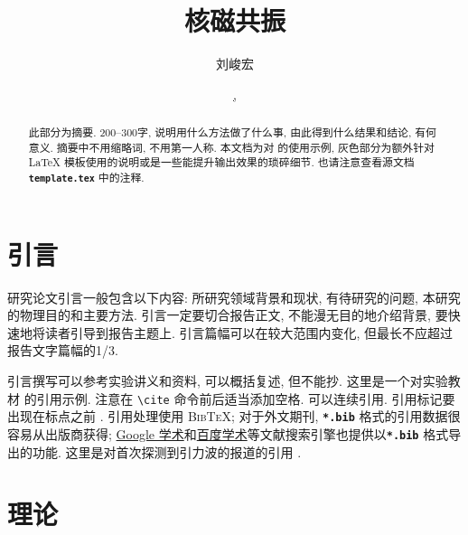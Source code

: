 \documentclass[font=default]{mpltx}
\makeatletter
\newcommand{\note}[1]{{\color{gray}#1}}
\newcommand*\cs[1]{\texttt{\textbackslash #1}}
\newcommand*\file[1]{\textbf{\texttt{#1}}}
\newcommand\releasedate{%
    \href{https://github.com/CastleStar14654/PKUMpLtX/releases/tag/\mpltx@fileversion}%
        {\mpltx@filedate, \mpltx@fileversion}}
\makeatother
\begin{document}
\title{核磁共振} %
\author{刘峻宏} %
\date{\releasedate}
\begin{abstract}
  此部分为摘要.
  200--300字, 说明用什么方法做了什么事, 由此得到什么结果和结论, 有何意义.
  摘要中不用缩略词, 不用第一人称.
  \note{本文档为对 \href{https://github.com/CastleStar14654/PKUMpLtX}{\pkg*{PKUMpLtX}} 的使用示例, 灰色部分为额外针对 \LaTeX{} 模板使用的说明或是一些能提升输出效果的琐碎细节.
    也请注意查看源文档 \file{template.tex} 中的注释.}
\end{abstract}

\maketitle

\section{引言}

研究论文引言一般包含以下内容:
所研究领域背景和现状,
有待研究的问题,
本研究的物理目的和主要方法.
引言一定要切合报告正文, 不能漫无目的地介绍背景, 要快速地将读者引导到报告主题上.
引言篇幅可以在较大范围内变化, 但最长不应超过报告文字篇幅的1/3.

引言撰写可以参考实验讲义和资料, 可以概括复述, 但不能抄.
\note{这里是一个对实验教材 \cite{jindaishiyan} 的引用示例.}
\note{注意在 \cs{cite} 命令前后适当添加空格.
  可以连续引用.
  引用标记要出现在标点之前 \cite{GBT7714,pr}.
  引用处理使用 \textsc{Bib\TeX};
  对于外文期刊, \file{*.bib} 格式的引用数据很容易从出版商获得;
  \href{https://scholar.google.com}{Google 学术}和\href{https://xueshu.baidu.com}{百度学术}等文献搜索引擎也提供以\file{*.bib} 格式导出的功能.
  这里是对首次探测到引力波的报道的引用 \cite{PhysRevLett.116.061102}.}

\section{理论}\label{sec:theory}
\end{document}
